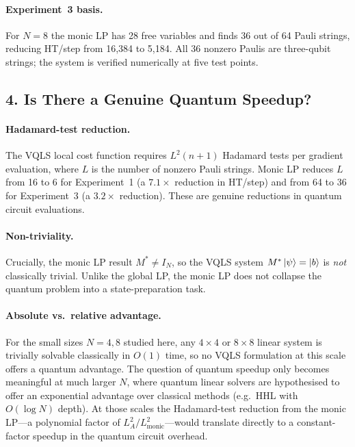 \documentclass{article}
\begin{document}
\paragraph{Experiment~3 basis.}
For $N=8$ the monic LP has 28 free variables and finds 36 out of 64 Pauli strings,
reducing HT/step from 16{,}384 to 5{,}184.  All 36 nonzero Paulis are
three-qubit strings; the system is verified numerically at five test points.

\subsection*{4. Is There a Genuine Quantum Speedup?}

\paragraph{Hadamard-test reduction.}
The VQLS local cost function requires $L^2(n+1)$ Hadamard tests per gradient
evaluation, where $L$ is the number of nonzero Pauli strings.  Monic LP reduces $L$
from 16 to 6 for Experiment~1 (a $7.1\times$ reduction in HT/step) and from 64 to
36 for Experiment~3 (a $3.2\times$ reduction).  These are genuine reductions in
quantum circuit evaluations.

\paragraph{Non-triviality.}
Crucially, the monic LP result $M^* \neq I_N$, so the VQLS system $M^*\ket{\psi}
= \ket{b}$ is \emph{not} classically trivial.  Unlike the global LP, the monic
LP does not collapse the quantum problem into a state-preparation task.

\paragraph{Absolute vs.\ relative advantage.}
For the small sizes $N = 4, 8$ studied here, any $4\times 4$ or $8\times 8$ linear
system is trivially solvable classically in $O(1)$ time, so no VQLS formulation at
this scale offers a quantum advantage.  The question of quantum speedup only becomes
meaningful at much larger $N$, where quantum linear solvers are hypothesised to offer
an exponential advantage over classical methods (e.g.\ HHL with $O(\log N)$ depth).
At those scales the Hadamard-test reduction from the monic LP---a polynomial factor of
$L_A^2 / L_{\mathrm{monic}}^2$---would translate directly to a constant-factor
speedup in the quantum circuit overhead.
\end{document}
